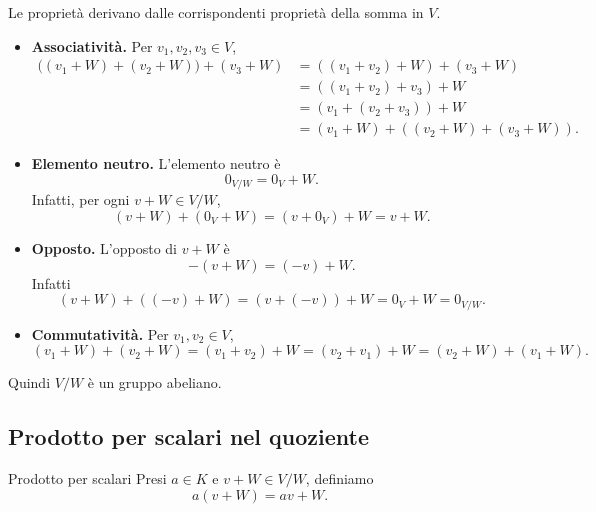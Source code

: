\documentclass[a4paper]{article}
\begin{document}
\begin{radioactive}
\begin{snippetproof}{}
    Le proprietà derivano dalle corrispondenti proprietà della somma in \(V\).

    \begin{itemize}
        \item \textbf{Associatività.}
        Per \(v_1,v_2,v_3 \in V\),
        \begin{align*}
            \big((v_1+W)+(v_2+W)\big)+(v_3+W)
            &=
            ((v_1+v_2)+W)+(v_3+W) \\
            &=
            ((v_1+v_2)+v_3)+W \\
            &=
            (v_1+(v_2+v_3))+W \\
            &=
            (v_1+W)+((v_2+W)+(v_3+W)).
        \end{align*}

        \item \textbf{Elemento neutro.}
        L'elemento neutro è
        \[
            0_{V/W}=0_V+W.
        \]
        Infatti, per ogni \(v+W \in V/W\),
        \[
            (v+W)+(0_V+W)
            =
            (v+0_V)+W
            =
            v+W.
        \]

        \item \textbf{Opposto.}
        L'opposto di \(v+W\) è
        \[
            -(v+W)=(-v)+W.
        \]
        Infatti
        \[
            (v+W)+((-v)+W)
            =
            (v+(-v))+W
            =
            0_V+W
            =
            0_{V/W}.
        \]

        \item \textbf{Commutatività.}
        Per \(v_1,v_2 \in V\),
        \[
            (v_1+W)+(v_2+W)
            =
            (v_1+v_2)+W
            =
            (v_2+v_1)+W
            =
            (v_2+W)+(v_1+W).
        \]
    \end{itemize}

    Quindi \(V/W\) è un gruppo abeliano.
\end{snippetproof}
\end{radioactive}

\subsection{Prodotto per scalari nel quoziente}

\begin{radioactive}
\begin{snippetdefinition}{Prodotto per scalari}
    Presi \(a \in K\) e \(v+W \in V/W\), definiamo
    \[
        a(v+W)
        =
        av+W.
    \]
\end{snippetdefinition}
\end{radioactive}
\end{document}
